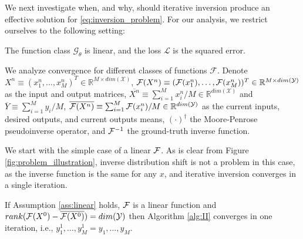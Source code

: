 \documentclass[nohyperref]{article}
\begin{document}
We next investigate when, and why, should iterative inversion produce an effective solution for \eqref{eq:inversion_problem}. For our analysis, we restrict ourselves to the following setting:
\begin{assumption}\label{ass:linear}
The function class $\mathcal{G}_\theta$ is linear, and the loss $\mathcal{L}$ is the squared error.    
\end{assumption}

We analyze convergence for different classes of functions $\mathcal{F}$.
Denote $X^n\equiv(x^n_1,\dots,x^n_M)^T\in\mathbb{R}^{M \times dim(\mathcal{X})}$, $\mathcal{F}(X^n)\equiv(\mathcal{F}(x_1^n),\dots,\mathcal{F}(x_M^n))^T\in\mathbb{R}^{M \times dim(\mathcal{Y})}$ as the input and output matrices, $\overline{X^n}\equiv\sum_{i=1}^M x_i^n / M\in\mathbb{R}^{dim(\mathcal{X})}$ and $\overline{Y}\equiv\sum_{i=1}^M y_i / M$, $\overline{\mathcal{F}(X^n)}\equiv\sum_{i=1}^M \mathcal{F}(x_i^n) / M\in\mathbb{R}^{dim(\mathcal{Y})}$ as the current inputs, desired outputs, and current outputs means,  $(\cdot)^\dagger$ the Moore-Penrose pseudoinverse operator, and $\mathcal{F}^{-1}$ the ground-truth inverse function.

We start with the simple case of a linear $\mathcal{F}$. As is clear from Figure \ref{fig:problem_illustration}, inverse distribution shift is not a problem in this case, as the inverse function is the same for any $x$,
and iterative inversion converges in a single iteration.

\begin{theorem}\label{the:linear_convergence}
     If Assumption \ref{ass:linear} holds, $\mathcal{F}$ is a linear function and %
    $rank(\mathcal{F}(X^0)-\overline{\mathcal{F}(X^0)})=dim(\mathcal{Y})$ then Algorithm \ref{alg:II} converges in one iteration, i.e.,  $y_1^1,\dots,y_M^1=y_1,\dots,y_M$.
\end{theorem}
\end{document}
